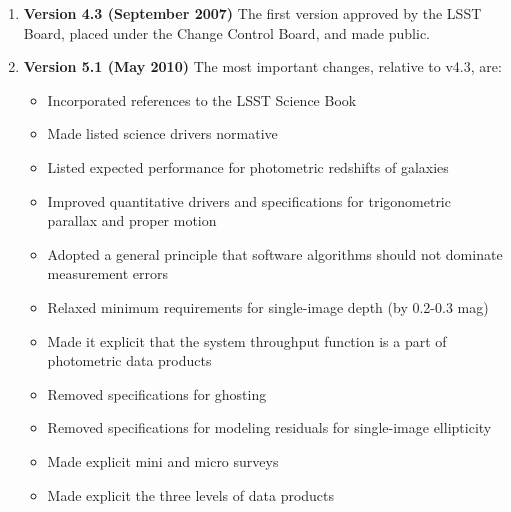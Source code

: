\begin{enumerate}
\item {\bf Version 4.3 (September 2007)} The first version approved by the LSST Board, placed under the Change
 Control Board, and made public.

\item {\bf Version 5.1 (May 2010)} The most important changes, relative to v4.3, are:
\begin{itemize}
\item Incorporated references to the LSST Science Book
\item Made listed science drivers normative
\item Listed expected performance for photometric redshifts of galaxies
\item Improved quantitative drivers and specifications for trigonometric parallax and proper motion
\item Adopted a general principle that software algorithms should not dominate measurement errors
\item Relaxed minimum requirements for single-image depth (by 0.2-0.3 mag)
\item Made it explicit that the system throughput function is a part of photometric data products
\item Removed specifications for ghosting
\item Removed specifications for modeling residuals for single-image ellipticity
\item Made explicit mini and micro surveys
\item Made explicit the three levels of data products
\end{itemize}
\end{enumerate}
